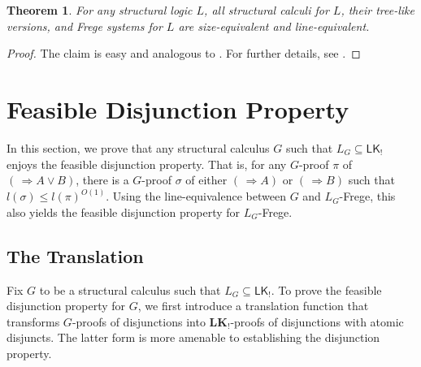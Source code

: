 \documentclass[12pt,a4paper]{article}
\theoremstyle{plain}
\newtheorem{theorem}{Theorem}
\theoremstyle{definition}
\newcommand{\LKajab}{\mathbf{LK_!}}
\begin{document}
\begin{theorem}\label{Lem: Equivalence Of Frege}
For any structural logic $L$, all structural calculi for $L$, their tree-like versions, and Frege systems for $L$ are size-equivalent and line-equivalent.
\end{theorem}
\begin{proof}
The claim is easy and analogous to \cite[Theorem 6.3]{Raheleh}. For further details, see \cite{Krajicek}.
\end{proof}


\section{Feasible Disjunction Property}

In this section, we prove that any structural calculus $G$ such that $L_G \subseteq \mathsf{LK_!}$ enjoys the feasible disjunction property. That is, for any $G$-proof $\pi$ of $(\, \Rightarrow A \vee B)$, there is a $G$-proof $\sigma$ of either $(\, \Rightarrow A)$ or $(\, \Rightarrow B)$ such that
$
l(\sigma) \leq l(\pi)^{O(1)}.
$
Using the line-equivalence between $G$ and $L_G$-Frege, this also yields the feasible disjunction property for $L_G$-Frege.

\subsection{The Translation}

Fix $G$ to be a structural calculus such that $L_G \subseteq \mathsf{LK_!}$. To prove the feasible disjunction property for $G$, we first introduce a translation function that transforms $G$-proofs of disjunctions into $\LKajab$-proofs of disjunctions with atomic disjuncts. The latter form is more amenable to establishing the disjunction property.
\end{document}

